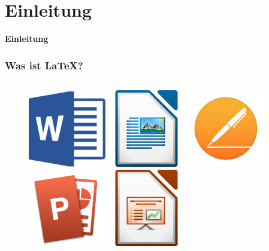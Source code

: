 %
\section{Einleitung}

\begin{frame}[c]
	\begin{center}
		\LARGE \textbf{Einleitung}
	\end{center}
\end{frame}


\begin{frame}[fragile]
  \frametitle{Was ist \LaTeX?}

  \vspace{-12pt}
  \begin{columns}
    
    \begin{column}{0.5\textwidth}
      \begin{figure}
        \centering
        \includegraphics[width=0.1\linewidth]{img/MSWord.png}
        \includegraphics[width=0.1\linewidth]{img/LOWriter.png}
        \includegraphics[width=0.1\linewidth]{img/APages.png}
        \includegraphics[width=0.1\linewidth]{img/MSPowerPoint.png}
        \includegraphics[width=0.1\linewidth]{img/LOImpress_svg.png}
        \label{fig:icons}
      \end{figure}
    \end{column}
    

\end{columns}
\end{frame}
